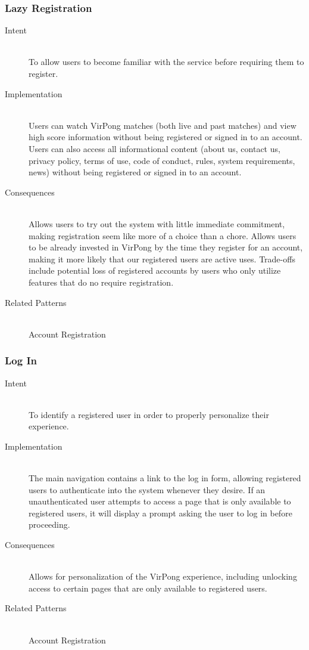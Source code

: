 		\subsubsection{Lazy Registration}
			\begin{description}
				\item[Intent] \hfill \\
					To allow users to become familiar with the service before requiring them to register.
				\item[Implementation] \hfill \\
					Users can watch VirPong matches (both live and past matches) and view high score information without being registered or signed in to an account. Users can also access all informational content (about us, contact us, privacy policy, terms of use, code of conduct, rules, system requirements, news) without being registered or signed in to an account.
				\item[Consequences] \hfill \\
					Allows users to try out the system with little immediate commitment, making registration seem like more of a choice than a chore. Allows users to be already invested in VirPong by the time they register for an account, making it more likely that our registered users are active uses. Trade-offs include potential loss of registered accounts by users who only utilize features that do no require registration.
				\item[Related Patterns] \hfill \\
					Account Registration
			\end{description}
			
		\subsubsection{Log In}
			\begin{description}
				\item[Intent] \hfill \\
					To identify a registered user in order to properly personalize their experience.
				\item[Implementation] \hfill \\
					The main navigation contains a link to the log in form, allowing registered users to authenticate into the system whenever they desire. If an unauthenticated user attempts to access a page that is only available to registered users, it will display a prompt asking the user to log in before proceeding.
				\item[Consequences] \hfill \\
					Allows for personalization of the VirPong experience, including unlocking access to certain pages that are only available to registered users.
				\item[Related Patterns] \hfill \\
					Account Registration
			\end{description}
			
